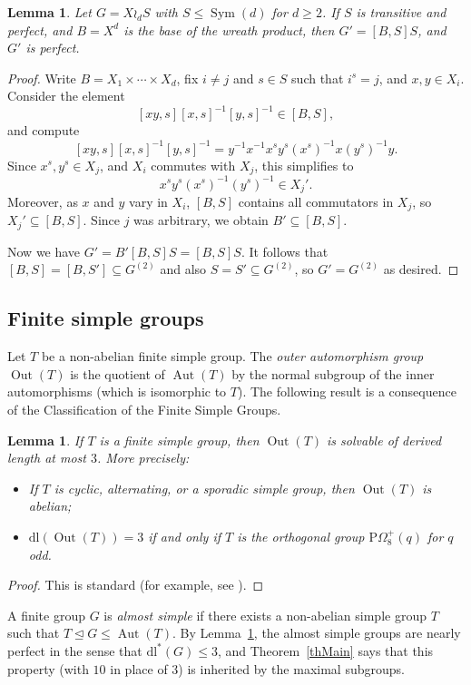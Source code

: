 \documentclass[11pt]{amsart}
\numberwithin{equation}{section}
\newtheorem{lemma}[theorem]{Lemma}
\theoremstyle{definition}
\theoremstyle{remark}
\newcommand{\Sym}{\mathop{\mathrm{Sym}}}
\newcommand{\Aut}{\mathop{\mathrm{Aut}}}
\newcommand{\Out}{\mathop{\mathrm{Out}}}
\newcommand{\dll}{\mathrm{dl^*}}
\newcommand{\dl}{\mathrm{dl}}
\begin{document}
\begin{lemma} \label{lem:wreath'}
Let $G = X \wr_d S$ with $S \leqslant \Sym(d)$ for $d \geq 2$.
If $S$ is transitive and perfect, and $B=X^d$ is the base of the wreath product, then $G' = [B,S]S$, and $G'$ is perfect.
\end{lemma}
\begin{proof}
Write $B=X_1\times \cdots \times X_d$,
fix $i \neq j$ and $s\in S$ such that $i^s=j$, and $x,y\in X_i$.
Consider the element
$$ [xy,s][x,s]^{-1}[y,s]^{-1}\in [B,S] , $$
and compute
$$ [xy,s][x,s]^{-1}[y,s]^{-1} =
y^{-1}x^{-1}x^s y^s (x^s)^{-1}x (y^s)^{-1}y. $$
Since $x^s,y^s\in X_j$, and $X_i$ commutes with $X_j$, this simplifies to
$$ x^s y^s (x^s)^{-1}(y^s)^{-1} \in X_j'. $$
Moreover, as $x$ and $y$ vary in $X_i$, $[B,S]$ contains all commutators in $X_j$, so $X_j' \subseteq [B,S]$. Since $j$ was arbitrary, we obtain $B' \subseteq [B,S]$.

Now we have $G'= B' [B,S] S = [B,S]S$.
It follows that $[B,S] = [B,S'] \subseteq G^{(2)}$ and also $S = S' \subseteq G^{(2)}$, so $G' = G^{(2)}$ as desired.
\end{proof}

\subsection{Finite simple groups} 

Let $T$ be a non-abelian finite simple group.
The {\itshape outer automorphism group} $\Out(T)$ is the quotient of $\Aut(T)$ by the normal subgroup of the inner automorphisms (which is isomorphic to $T$).
The following result is a consequence of the Classification of the Finite Simple Groups.

\begin{lemma} \label{lemOut}
If $T$ is a finite simple group, then $\Out(T)$ is solvable of derived length at most $3$.
More precisely:
\begin{itemize}
\item If $T$ is cyclic, alternating, or a sporadic simple group, then $\Out(T)$ is abelian;
\item $\dl(\Out(T)) =3$ if and only if $T$ is the orthogonal group $\mathrm{P}\Omega^+_8(q)$ for $q$ odd.
\end{itemize}
\end{lemma}
\begin{proof}
This is standard (for example, see \cite[Lem.~3.2]{Sab26}).
\end{proof}

A finite group $G$ is {\itshape almost simple} if there exists a non-abelian simple group $T$ such that $T \unlhd G \leqslant \Aut(T)$.
By Lemma~\ref{lemOut}, the almost simple groups are nearly perfect in the sense that $\dll(G) \leq 3$, and Theorem~\ref{thMain} says that this property (with $10$ in place of $3$) is inherited by the maximal subgroups.
\end{document}
